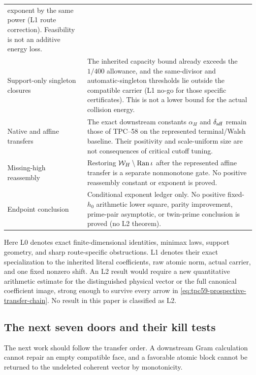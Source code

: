 \begin{center}
\begin{tabular}{>{\raggedright\arraybackslash}p{}
                >{\raggedright\arraybackslash}p{}}
  exponent by the same power (L1 route correction).  Feasibility is not an
  additive energy loss. \\
Support-only singleton closures
& The inherited capacity bound already exceeds the \(1/400\) allowance,
  and the same-divisor and automatic-singleton thresholds lie outside the
  compatible carrier (L1 no-go for those specific certificates).  This is
  not a lower bound for the actual collision energy. \\
Native and affine transfers
& The exact downstream constants \(\alpha_H\) and \(\delta_{\rm aff}\)
  remain those of TPC--58 on the represented terminal/Walsh baseline.
  Their positivity and scale-uniform size are not consequences of critical
  cutoff tuning. \\
Missing-high reassembly
& Restoring \(\mathcal W_H\setminus\operatorname{Ran}\iota\) after the represented affine
  transfer is a separate nonmonotone gate.  No positive reassembly constant
  or exponent is proved. \\
Endpoint conclusion
& Conditional exponent ledger only.  No positive fixed-\(h_0\) arithmetic
  lower square, parity improvement, prime-pair asymptotic, or twin-prime
  conclusion is proved (no L2 theorem). \\
\bottomrule
\end{tabular}
\end{center}

Here L0 denotes exact finite-dimensional identities, minimax laws, support
geometry, and sharp route-specific obstructions.  L1 denotes their exact
specialization to the inherited literal coefficients, raw atomic norm,
actual carrier, and one fixed nonzero shift.  An L2 result would require a
new quantitative arithmetic estimate for the distinguished physical vector
or the full canonical coefficient image, strong enough to survive every
arrow in \eqref{eq:tpc59-prospective-transfer-chain}.  No result in this
paper is classified as L2.

\subsection{The next seven doors and their kill tests}

The next work should follow the transfer order.  A downstream Gram
calculation cannot repair an empty compatible face, and a favorable atomic
block cannot be returned to the undeleted coherent vector by monotonicity.

